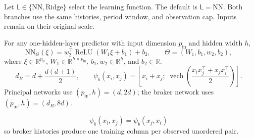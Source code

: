 \documentclass[11pt]{article}
\newcommand{\R}{\mathbb{R}}
\newcommand{\relu}{\operatorname{ReLU}}
\begin{document}
Let $\mathsf L\in\{\mathrm{NN},\mathrm{Ridge}\}$ select the learning function. The default is $\mathsf L=\mathrm{NN}$. Both branches use the same histories, period window, and observation cap. Inputs remain on their original scale.

For any one-hidden-layer predictor with input dimension $p_{\mathrm{in}}$ and hidden width $h$,
\[
\mathrm{NN}_{\Theta}(\xi)=w_2^\top\relu(W_1\xi+b_1)+b_2,\qquad
\Theta=(W_1,b_1,w_2,b_2),
\]
where $\xi\in\R^{p_{\mathrm{in}}}$, $W_1\in\R^{h\times p_{\mathrm{in}}}$, $b_1,w_2\in\R^h$, and $b_2\in\R$.
\[
d_B=d+\frac{d(d+1)}{2},\qquad
\psi_b(x_i,x_j)=
\left[
x_i+x_j;\;
\operatorname{vech}\!\left(\frac{x_ix_j^\top+x_jx_i^\top}{2}\right)
\right].
\]
Principal networks use $(p_{\mathrm{in}},h)=(d,2d)$; the broker network uses $(p_{\mathrm{in}},h)=(d_B,8d)$.

\[
\psi_b(x_i,x_j)=\psi_b(x_j,x_i)
\]
so broker histories produce one training column per observed unordered pair.
\end{document}
